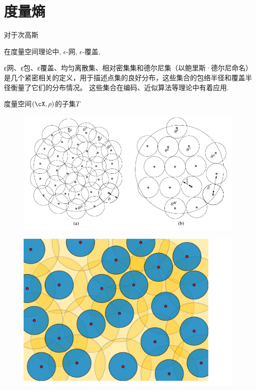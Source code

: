 \section{度量熵}

对于次高斯

在度量空间理论中, $\epsilon$-网,  $\epsilon$-覆盖, 

ε网、ε包、ε覆盖、均匀离散集、相对密集集和德尔尼集（以鲍里斯·德尔尼命名）是几个紧密相关的定义，用于描述点集的良好分布，这些集合的包络半径和覆盖半径衡量了它们的分布情况。
这些集合在编码、近似算法等理论中有着应用. 


度量空间$(\cX, \rho)$的子集$T$



\begin{figure}[H]
	\centering 
	\includegraphics[width=.95\textwidth]{figure/covering-packing.pdf}
\end{figure}


\begin{figure}[H]
	\centering 
	\includegraphics[width=.5\textwidth]{figure/Metric_epsilon-net.pdf}
\end{figure}







